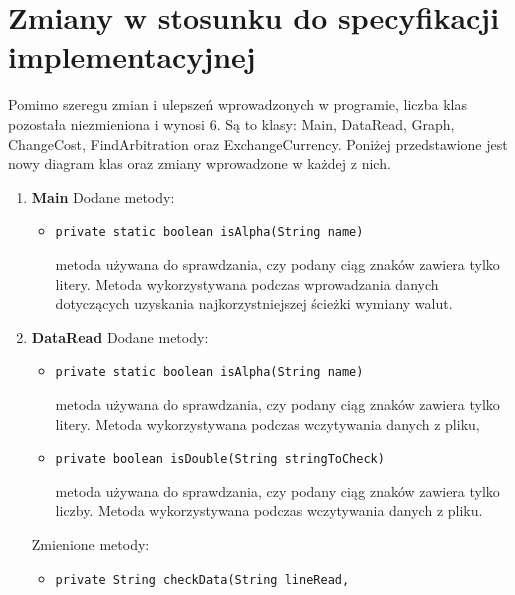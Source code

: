 \documentclass[12pt]{article}
\begin{document}
\section{Zmiany w stosunku do specyfikacji implementacyjnej}
Pomimo szeregu zmian i ulepszeń wprowadzonych w programie, liczba klas pozostała niezmieniona i wynosi 6. Są to klasy: Main, DataRead, Graph, ChangeCost, FindArbitration oraz ExchangeCurrency. Poniżej przedstawione jest nowy diagram klas oraz zmiany wprowadzone w każdej z nich.
\begin{enumerate}
\item \textbf{Main}
\newline\newline
   Dodane metody:
    \begin{itemize}
        \item \begin{verbatim}private static boolean isAlpha(String name)\end{verbatim}
        metoda używana do sprawdzania, czy podany ciąg znaków zawiera tylko litery. Metoda wykorzystywana podczas wprowadzania danych dotyczących uzyskania najkorzystniejszej ścieżki wymiany walut.
    \end{itemize}
\item \textbf{DataRead}
\newline\newline
   Dodane metody:
   \begin{itemize}
        \item \begin{verbatim}private static boolean isAlpha(String name)\end{verbatim}
        metoda używana do sprawdzania, czy podany ciąg znaków zawiera tylko litery. Metoda wykorzystywana podczas wczytywania danych z pliku,
    \end{itemize}
    \begin{itemize}
    \item \begin{verbatim}private boolean isDouble(String stringToCheck)\end{verbatim}
        metoda używana do sprawdzania, czy podany ciąg znaków zawiera tylko liczby. Metoda wykorzystywana
        podczas wczytywania danych z pliku.
    \end{itemize}
    Zmienione metody:
    \begin{itemize}
        \item \begin{verbatim}private String checkData(String lineRead,

\end{verbatim}
\end{itemize}
\end{enumerate}
\end{document}
